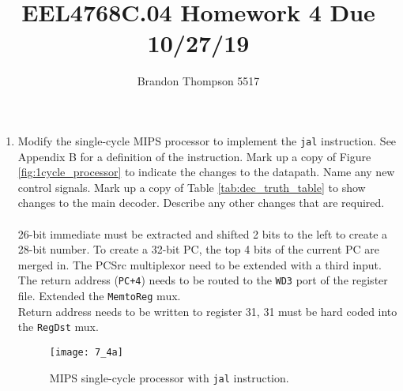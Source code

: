\documentclass[a4paper]{article}
\begin{document}
	\title{EEL4768C.04 Homework 4 Due 10/27/19}
	\author{Brandon Thompson 5517}
	\maketitle

	\begin{enumerate}
		\item Modify the single-cycle MIPS processor to implement the \texttt{jal}
			instruction. See Appendix B for a definition of the instruction.
			Mark up a copy of Figure \ref{fig:1cycle_processor} to indicate the changes
			to the datapath. Name any new control signals. Mark up a copy of
			Table \ref{tab:dec_truth_table}
			to show changes to the main decoder. Describe any other changes
			that are required.\\
			\\
			26-bit immediate must be extracted and shifted 2 bits to the left to create
			a 28-bit number. To create a 32-bit PC, the top 4 bits of the current PC are
			merged in. The PCSrc multiplexor need to be extended with a third input.\\
			The return address (\texttt{PC+4}) needs to be routed to the \texttt{WD3}
			port of the register file. Extended the \texttt{MemtoReg} mux.\\
			Return address needs to be written to register 31, 31 must be hard coded
			into the \texttt{RegDst} mux.
			\begin{figure}[ht]
				\centering
				\texttt{[image: 7\_4a]}
				\caption{MIPS single-cycle processor with \texttt{jal} instruction.}
				\label{fig:7_4a}
			\end{figure}
			\begin{table}[ht]
				\noindent{}
\end{table}
\end{enumerate}
\end{document}
